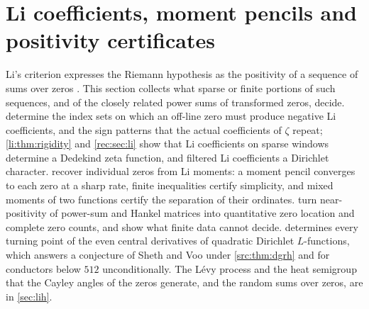 \providecommand{\recsinc}{\operatorname{sinc}}
\providecommand{\recgE}{\gamma_{\mathrm{E}}}
\providecommand{\recGen}{\operatorname{Gen}}
\providecommand{\recav}{\operatorname{av}}
\providecommand{\recA}{\mathcal{A}}
\providecommand{\recartanh}{\operatorname{artanh}}
\providecommand{\anapos}[1]{\bigl(#1\bigr)_{+}}
\providecommand{\ananeg}[1]{\bigl(#1\bigr)_{-}}
\providecommand{\anaone}{\mathbf{1}}
\providecommand{\anaE}{\mathcal{E}}
\providecommand{\anaEx}{\mathbb{E}}
\providecommand{\anaPr}{\mathbb{P}}
\providecommand{\anaM}{\mathcal{M}}
\providecommand{\anaW}{\mathcal{W}}
\providecommand{\anaZ}{\mathcal{Z}}
\providecommand{\anaC}{\mathcal{C}}
\providecommand{\liE}{\mathcal{E}}
\providecommand{\liD}{\mathcal{D}}
\providecommand{\liZ}{\mathcal{Z}}
\providecommand{\liT}{\mathbb{T}}
\providecommand{\lidist}[1]{\lVert #1\rVert_{\mathbb{T}}}
\providecommand{\liEx}{\mathbb{E}}
\providecommand{\liind}{\mathbf{1}}
\providecommand{\liHk}{\mathcal{H}}
\providecommand{\liKk}{\mathcal{K}}

\section{Li coefficients, moment pencils and positivity certificates}\label{sec:li}

Li's criterion expresses the Riemann hypothesis as the positivity of a sequence of sums over
zeros \cite{Li1997Positivity,BombieriLagariasComplements,Lagarias2007Li}. This section collects
what sparse or finite portions of such sequences, and of the closely related power sums of
transformed zeros, decide.  determine the index sets on
which an off-line zero must produce negative Li coefficients, and the sign patterns that the
actual coefficients of $\zeta$ repeat; \cref{li:thm:rigidity} and \cref{rec:sec:li} show that
Li coefficients on sparse windows determine a Dedekind zeta function, and filtered Li
coefficients a Dirichlet character.  recover individual
zeros from Li moments: a moment pencil converges to each zero at a sharp rate, finite
inequalities certify simplicity, and mixed moments of two functions certify the separation
of their ordinates.  turn near-positivity of
power-sum and Hankel matrices into quantitative zero location and complete zero counts, and show
what finite data cannot decide.  determines every turning point of the even
central derivatives of quadratic Dirichlet $L$-functions, which answers a conjecture of Sheth and
Voo under \cref{src:thm:dgrh} and for conductors below $512$ unconditionally. The L\'evy process and the heat semigroup that the Cayley angles
of the zeros generate, and the random sums over zeros, are in \cref{sec:lih}.

